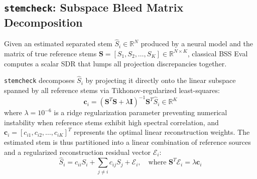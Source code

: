 \documentclass[10pt,journal,compsoc]{IEEEtran}
\begin{document}
\subsection{\texttt{stemcheck}: Subspace Bleed Matrix Decomposition}
Given an estimated separated stem $\hat{S}_i \in \mathbb{R}^N$ produced by a neural model and the matrix of true reference stems $\mathbf{S} = [S_1, S_2, \dots, S_K] \in \mathbb{R}^{N \times K}$, classical BSS Eval computes a scalar SDR that lumps all projection discrepancies together.

\texttt{stemcheck} decomposes $\hat{S}_i$ by projecting it directly onto the linear subspace spanned by all reference stems via Tikhonov-regularized least-squares:
\begin{equation}
\mathbf{c}_i = (\mathbf{S}^T \mathbf{S} + \lambda \mathbf{I})^{-1} \mathbf{S}^T \hat{S}_i \in \mathbb{R}^K
\end{equation}
where $\lambda = 10^{-6}$ is a ridge regularization parameter preventing numerical instability when reference stems exhibit high spectral correlation, and $\mathbf{c}_i = [c_{i1}, c_{i2}, \dots, c_{iK}]^T$ represents the optimal linear reconstruction weights. The estimated stem is thus partitioned into a linear combination of reference sources and a regularized reconstruction residual vector $\mathcal{E}_i$:
\begin{equation}
\hat{S}_i = c_{ii} S_i + \sum_{j \ne i} c_{ij} S_j + \mathcal{E}_i, \quad \text{where } \mathbf{S}^T \mathcal{E}_i = \lambda \mathbf{c}_i
\end{equation}
\end{document}
